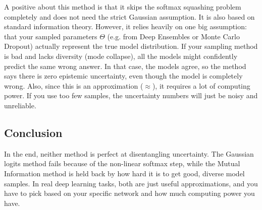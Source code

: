 \documentclass{article}
\begin{document}
A positive about this method is that it skips the softmax squashing problem completely and does not need the strict Gaussian assumption. It is also based on standard information theory. However, it relies heavily on one big assumption: that your sampled parameters $\Theta$ (e.g. from Deep Ensembles or Monte Carlo Dropout) actually represent the true model distribution. If your sampling method is bad and lacks diversity (mode collapse), all the models might confidently predict the same wrong answer. In that case, the models agree, so the method says there is zero epistemic uncertainty, even though the model is completely wrong. Also, since this is an approximation ($\approx$), it requires a lot of computing power. If you use too few samples, the uncertainty numbers will just be noisy and unreliable.

\subsection*{Conclusion}

In the end, neither method is perfect at disentangling uncertainty. The Gaussian logits method fails because of the non-linear softmax step, while the Mutual Information method is held back by how hard it is to get good, diverse model samples. In real deep learning tasks, both are just useful approximations, and you have to pick based on your specific network and how much computing power you have.


\newpage



\end{document}
